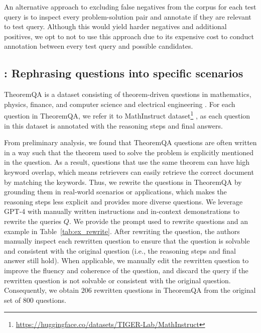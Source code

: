 An alternative approach to excluding false negatives from the corpus for each test query is to inspect every problem-solution pair and annotate if they are relevant to test query.
Although this would yield harder negatives and additional positives, we opt to not to use this approach due to its expensive cost to conduct annotation between every test query and possible candidates.



\subsection{\theorem: Rephrasing questions into specific scenarios}
\label{app:data:theoremqa}
TheoremQA is a dataset consisting of theorem-driven questions in mathematics, physics, finance, and computer science and electrical engineering \citep{chen-etal-2023-theoremqa}. 
For each question in TheoremQA, we refer it to MathInstruct dataset\footnote{\url{https://huggingface.co/datasets/TIGER-Lab/MathInstruct}} \citep{yue2023mammoth}, as each question in this dataset is annotated with the reasoning steps and final answers. 

From preliminary analysis, we found that TheoremQA questions are often written in a way such that the theorem used to solve the problem is explicitly mentioned in the question.
As a result, questions that use the same theorem can have high keyword overlap, which means retrievers can easily retrieve the correct document by matching the keywords.
Thus, we rewrite the questions in TheoremQA by grounding them in real-world scenarios or applications, which makes the reasoning steps less explicit and provides more diverse questions.
We leverage GPT-4 with manually written instructions and in-context demonstrations to rewrite the queries $Q$.
We provide the prompt used to rewrite \theorem questions and an example in Table~\ref{tab:ex_rewrite}.
After rewriting the question, the authors manually inspect each rewritten question to ensure that the question is solvable and consistent with the original question (i.e., the reasoning steps and final answer still hold).
When applicable, we manually edit the rewritten question to improve the fluency and coherence of the question, and discard the query if the rewritten question is not solvable or consistent with the original question.
Consequently, we obtain $206$ rewritten questions in TheoremQA from the original set of $800$ questions.



